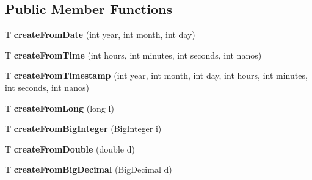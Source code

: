 \subsection*{Public Member Functions}
\begin{DoxyCompactItemize}
\item 
\mbox{\label{interfacecom_1_1mysql_1_1cj_1_1result_1_1_value_factory_a5c7828e8fe372c9070e0e64ddafac761}} 
T {\bfseries create\+From\+Date} (int year, int month, int day)
\item 
\mbox{\label{interfacecom_1_1mysql_1_1cj_1_1result_1_1_value_factory_a5edf0bed225d34bd1fade72d8f106760}} 
T {\bfseries create\+From\+Time} (int hours, int minutes, int seconds, int nanos)
\item 
\mbox{\label{interfacecom_1_1mysql_1_1cj_1_1result_1_1_value_factory_accbdc6c6970a22e40a0b1d72213334e6}} 
T {\bfseries create\+From\+Timestamp} (int year, int month, int day, int hours, int minutes, int seconds, int nanos)
\item 
\mbox{\label{interfacecom_1_1mysql_1_1cj_1_1result_1_1_value_factory_a48c32868f2e3efac502522211a40f642}} 
T {\bfseries create\+From\+Long} (long l)
\item 
\mbox{\label{interfacecom_1_1mysql_1_1cj_1_1result_1_1_value_factory_a8b18f90981ce59ba61491c945b2820fe}} 
T {\bfseries create\+From\+Big\+Integer} (Big\+Integer i)
\item 
\mbox{\label{interfacecom_1_1mysql_1_1cj_1_1result_1_1_value_factory_a9977e0c9d2bb9e306ee4a5a2ead6840c}} 
T {\bfseries create\+From\+Double} (double d)
\item 
\mbox{\label{interfacecom_1_1mysql_1_1cj_1_1result_1_1_value_factory_ab4acc647cdd39297d8bad28339a8ef18}} 
T {\bfseries create\+From\+Big\+Decimal} (Big\+Decimal d)
\item 
\mbox{\label{interfacecom_1_1mysql_1_1cj_1_1result_1_1_value_factory_a0724fcd13ef1ef07c781a61167847a11}} 

\end{DoxyCompactItemize}

